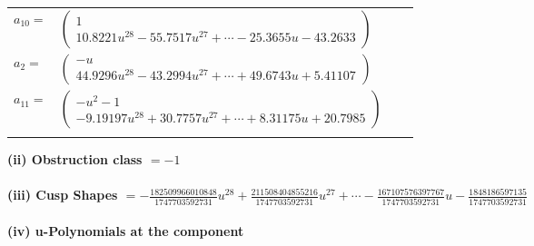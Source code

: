 \documentclass[1p]{elsarticle_modified}
\theoremstyle{definition}
\begin{document}
\begin{tabular}{m{7pt} m{180pt} m{7pt} m{180pt} }
\flushright $a_{10}=$&$\begin{pmatrix}1\\10.8221 u^{28}-55.7517 u^{27}+\cdots-25.3655 u-43.2633\end{pmatrix}$ \\
\flushright $a_{2}=$&$\begin{pmatrix}- u\\44.9296 u^{28}-43.2994 u^{27}+\cdots+49.6743 u+5.41107\end{pmatrix}$ \\
\flushright $a_{11}=$&$\begin{pmatrix}- u^2-1\\-9.19197 u^{28}+30.7757 u^{27}+\cdots+8.31175 u+20.7985\end{pmatrix}$\\&\end{tabular}
\flushleft \textbf{(ii) Obstruction class $= -1$}\\~\\
\flushleft \textbf{(iii) Cusp Shapes $= -\frac{182509966010848}{1747703592731} u^{28}+\frac{211508404855216}{1747703592731} u^{27}+\cdots-\frac{167107576397767}{1747703592731} u-\frac{1848186597135}{1747703592731}$}\\~\\
\newpage\renewcommand{\arraystretch}{1}
\flushleft \textbf{(iv) u-Polynomials at the component}\newline \\
\end{document}
